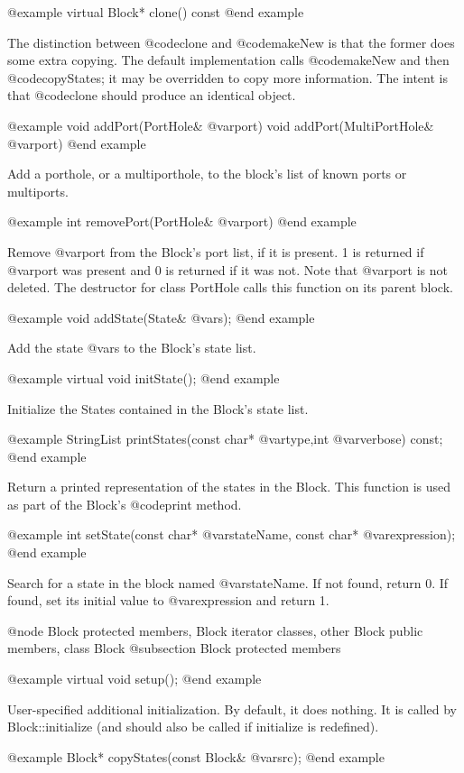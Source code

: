 @example
virtual Block* clone() const
@end example

The distinction between @code{clone} and @code{makeNew} is that the
former does some extra copying.  The default implementation calls
@code{makeNew} and then @code{copyStates}; it may be overridden to
copy more information.  The intent is that @code{clone} should produce
an identical object.

@example
void addPort(PortHole& @var{port})
void addPort(MultiPortHole& @var{port})
@end example

Add a porthole, or a multiporthole, to the block's list of known ports
or multiports.

@example
int removePort(PortHole& @var{port})
@end example

Remove @var{port} from the Block's port list, if it is present.
1 is returned if @var{port} was present and 0 is returned if it
was not.  Note that @var{port} is not deleted.  The destructor
for class PortHole calls this function on its parent block.

@example
void addState(State& @var{s});
@end example

Add the state @var{s} to the Block's state list.

@example
virtual void initState();
@end example

Initialize the States contained in the Block's state list.

@example
StringList printStates(const char* @var{type},int @var{verbose}) const;
@end example

Return a printed representation of the states in the Block.  This
function is used as part of the Block's @code{print} method.

@example
int setState(const char* @var{stateName}, const char* @var{expression});
@end example

Search for a state in the block named @var{stateName}.  If not found,
return 0.  If found, set its initial value to @var{expression} and
return 1.

@node Block protected members, Block iterator classes, other Block public members, class Block
@subsection Block protected members

@example
virtual void setup();
@end example

User-specified additional initialization.  By default, it does nothing.
It is called by Block::initialize (and should also be called if
initialize is redefined).

@example
Block* copyStates(const Block& @var{src});
@end example

